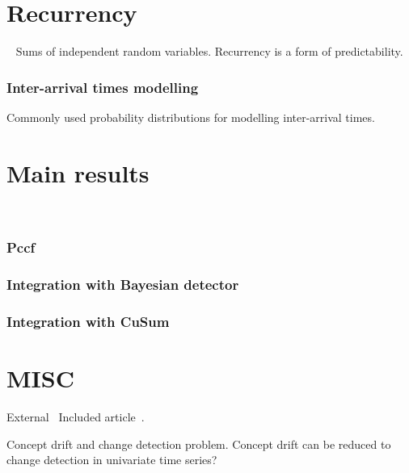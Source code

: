 \documentclass[licentiate,utf8,lot,loar,lof,shortloft,index]{jydiss}
\begin{document}
\chapter{Recurrency}
~\cite{feller2008introduction}
Sums of independent random variables.
Recurrency is a form of predictability.

\subsection{Inter-arrival times modelling}
Commonly used probability distributions for modelling inter-arrival times.


\chapter{Main results}
~\cite{MaslovSDM2016, MaslovIJCNN2017}
\subsection{Pccf}
\subsection{Integration with Bayesian detector}
\subsection{Integration with CuSum}

\chapter{MISC}

External~\cite{shewhart1931economic}
Included article~\cite{sha1}.

Concept drift and change detection problem.
Concept drift can be reduced to change detection in univariate time series?
\end{document}
